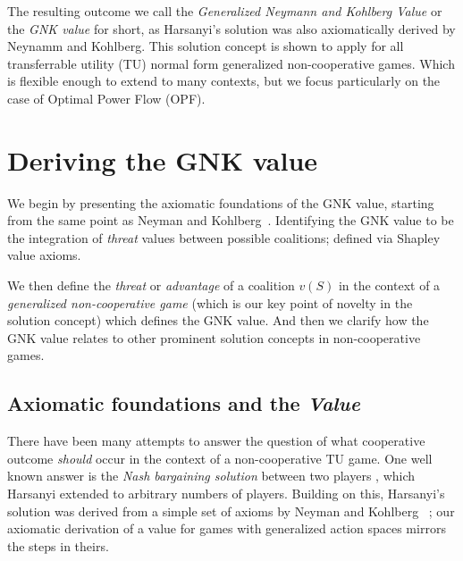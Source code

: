 The resulting outcome we call the \textit{Generalized Neymann and Kohlberg Value} or the \textit{GNK value} for short, 
as Harsanyi's solution was also axiomatically derived by Neynamm and Kohlberg.\cite{value2,KOHLBERG2018139}
This solution concept is shown to apply for all transferrable utility (TU) normal form generalized non-cooperative games.
Which is flexible enough to extend to many contexts, but we focus particularly on the case of Optimal Power Flow (OPF).

\section{Deriving the GNK value}\label{the_value_def2}

We begin by presenting the axiomatic foundations of the GNK value, starting from the same point as Neyman and Kohlberg~\cite{value2}.
Identifying the GNK value to be the integration of \emph{threat} values between possible coalitions; defined via Shapley value axioms.

We then define the \emph{threat} or \emph{advantage} of a coalition $v(S)$ in the context of a \textit{generalized non-cooperative game} (which is our key point of novelty in the solution concept) which defines the GNK value.
And then we clarify how the GNK value relates to other prominent solution concepts in non-cooperative games.

\subsection{Axiomatic foundations and the \textit{Value}}\label{the_value_def}

There have been many attempts to answer the question of what cooperative outcome \textit{should} occur in the context of a non-cooperative TU game.
One well known answer is the \textit{Nash bargaining solution} between two players \cite{nash2}, which Harsanyi \cite{values3} extended to arbitrary numbers of players.
Building on this, Harsanyi's solution was derived from a simple set of axioms by Neyman and Kohlberg ~\cite{value2}; 
our axiomatic derivation of a value for games with generalized action spaces mirrors the steps in theirs.

